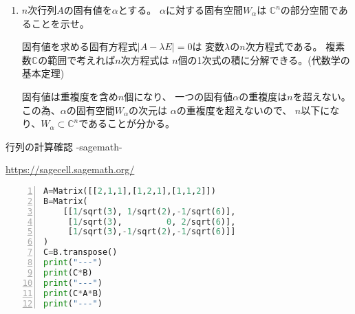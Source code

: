 \documentclass[10pt,b5paper]{ltjsarticle}
\begin{document}
\begin{enumerate}
       \hrulefill
 \item $n$次行列$A$の固有値を$\alpha$とする。
       $\alpha$に対する固有空間$W_{\alpha}$は
       $\mathbb{C}^n$の部分空間であることを示せ。

       \dotfill

       固有値を求める固有方程式$\lvert A - \lambda E\rvert =0$は
       変数$\lambda$の$n$次方程式である。
       複素数$\mathbb{C}$の範囲で考えれば$n$次方程式は
       $n$個の1次式の積に分解できる。(代数学の基本定理)

       固有値は重複度を含め$n$個になり、
       一つの固有値$\alpha$の重複度は$n$を超えない。
       この為、$\alpha$の固有空間$W_{\alpha}$の次元は
       $\alpha$の重複度を超えないので、
       $n$以下になり、$W_{\alpha} \subset \mathbb{C}^n$であることが分かる。
\end{enumerate}


\hrulefill

行列の計算確認 -sagemath-

\url{https://sagecell.sagemath.org/}

\begin{lstlisting}[language=Python,basicstyle={\small},frame=single,numbers=left]
A=Matrix([[2,1,1],[1,2,1],[1,1,2]])
B=Matrix(
    [[1/sqrt(3), 1/sqrt(2),-1/sqrt(6)],
     [1/sqrt(3),         0, 2/sqrt(6)],
     [1/sqrt(3),-1/sqrt(2),-1/sqrt(6)]]
)
C=B.transpose()
print("---")
print(C*B)
print("---")
print(C*A*B)
print("---")
\end{lstlisting}
\end{document}
